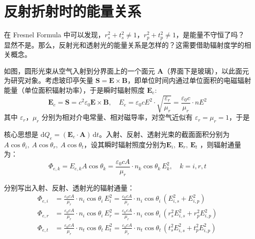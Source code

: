 \documentclass[UTF8]{report}
\theoremstyle{MyLineTheoremStyle} %
\theoremstyle{MyBlockTheoremStyle} %
\theoremstyle{MySubsubsectionStyle} %
\begin{document}


\section{反射折射时的能量关系}

在 Fresnel Formula 中可以发现，$r_s^2 + t_s^2 \ne 1$，$r_p^2 + t_p^2 \ne 1$，是能量不守恒了吗？显然不是。那么，反射光和透射光的能量关系是怎样的？这需要借助辐射度学的相关概念。

如图，圆形光束从空气入射到分界面上的一个面元 $\boldsymbol{A}$（界面下是玻璃），以此面元为研究对象。考虑玻印亭矢量 $\boldsymbol{S} = \boldsymbol{E} \times \boldsymbol{B}$，即单位时间内通过单位面积的电磁辐射能量（单位面积辐射功率），于是瞬时辐射照度 $\boldsymbol{E}_e$: 
\begin{equation}
\boldsymbol{E}_e = \boldsymbol{S} = c^2 \varepsilon_0 \boldsymbol{E} \times \boldsymbol{B},\quad  E_e = \varepsilon_0 cE^2 \cdot \sqrt{\frac{\varepsilon_r}{\mu_r}} = \frac{\varepsilon_0 c}{\mu_r}\cdot  nE^2
\end{equation}
其中 $\varepsilon_r$，$\mu_r$ 分别为相对介电常量、相对磁导率，对空气近似有 $\varepsilon_r = \mu_r = 1$，于是

核心思想是 $\mathrm{d} Q_e = (\boldsymbol{E}_e \cdot \boldsymbol{A})\, \mathrm{d}t $。入射、反射、透射光束的截面面积分别为 $A \cos \theta_i,\ A \cos \theta_r,\ A \cos \theta_t$，设其瞬时辐射照度分别为$\boldsymbol{E}_i,\ \boldsymbol{E}_r,\ \boldsymbol{E}_t$ ，则辐射通量为：
\begin{equation}
\Phi_{e, k} = E_{e, k} A \cos \theta_k = \frac{\varepsilon_0 cA }{\mu_r}\cdot  n_k\cos \theta_k\,E_k^2,\quad  k = i, r, t
\end{equation}

分别写出入射、反射、透射光的辐射通量：
\begin{align}
\Phi_{e,i} &= \frac{\varepsilon_0 cA }{\mu_r} \cdot  n_i\cos \theta_i\,E_i^2 
= \frac{\varepsilon_0 cA }{\mu_r} \cdot  n_i\cos \theta_i\, \left( E_{i,s}^2 + E_{i,p}^2 \right) 
\\ 
\Phi_{e,r} 
&= \frac{\varepsilon_0 cA }{\mu_r} \cdot  n_i\cos \theta_i\,E_r^2 
= \frac{\varepsilon_0 cA }{\mu_r} \cdot  n_i\cos \theta_i\, \left( r_s^2E_{i,s}^2 + r_p^2E_{i,p}^2 \right) 
\\ 
\Phi_{e,t} 
&= \frac{\varepsilon_0 cA }{\mu_r} \cdot  n_t\cos \theta_t\,E_t^2 
= \frac{\varepsilon_0 cA }{\mu_r} \cdot  n_t \cos \theta_t \, \left( t_s^2E_{i,s}^2 + t_p^2E_{i,p}^2 \right) 
\end{align}
\end{document}
